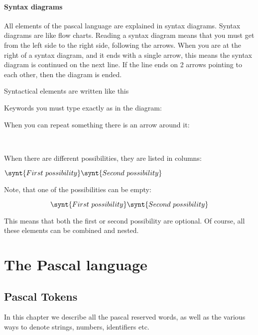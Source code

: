 \documentclass{report}
\begin{document}
\subsection*{Syntax diagrams}
All elements of the pascal language are explained in syntax diagrams.
Syntax diagrams are like flow charts. Reading a syntax diagram means that
you must get from the left side to the right side, following the arrows.
When you are at the right of a syntax diagram, and it ends with a single
arrow, this means the syntax diagram is continued on the next line. If
the line ends on 2 arrows pointing to each other, then the diagram is
ended.

Syntactical elements are written like this
\begin{mysyntdiag}
\end{mysyntdiag}
Keywords you must type exactly as in the diagram:
\begin{mysyntdiag}
\end{mysyntdiag}
When you can repeat something there is an arrow around it:
\begin{mysyntdiag}
\<[b]  \\ \>
\end{mysyntdiag}
When there are different possibilities, they are listed in columns:
\begin{mysyntdiag}
\(
\synt{First\ possibility} \\
\synt{Second\ possibility}
\)
\end{mysyntdiag}
Note, that one of the possibilities can be empty:
\begin{mysyntdiag}
\[
\synt{First\ possibility} \\
\synt{Second\ possibility}
\]
\end{mysyntdiag}
This means that both the first or second possibility are optional.
Of course, all these elements can be combined and nested.

\part{The Pascal language}


\chapter{Pascal Tokens}
In this chapter we describe all the pascal reserved words, as well as the
various ways to denote strings, numbers, identifiers etc.
\end{document}

